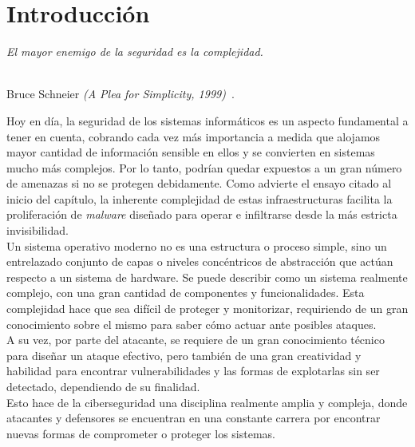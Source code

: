 \chapter{Introducción}
\label{cap:capitulo1}
\setcounter{page}{1}

\begin{flushright}
\begin{minipage}[]{10cm}
\emph{\guillemotleft El mayor enemigo de la seguridad es la complejidad.\guillemotright}\\
\end{minipage}\\

Bruce Schneier \textit{(A Plea for Simplicity, 1999)}~\cite{schneier}.
\end{flushright}

\vspace{1cm}

Hoy en día, la seguridad de los sistemas informáticos es un aspecto fundamental a tener en cuenta, cobrando cada vez más importancia a medida que alojamos mayor cantidad de información sensible en ellos y se convierten en sistemas mucho más complejos. Por lo tanto, podrían quedar expuestos a un gran número de amenazas si no se protegen debidamente.
Como advierte el ensayo citado al inicio del capítulo, la inherente complejidad de estas infraestructuras facilita la proliferación de \textit{malware} diseñado para operar e infiltrarse desde la más estricta invisibilidad.\\

Un sistema operativo moderno no es una estructura o proceso simple, sino un entrelazado conjunto de capas o niveles concéntricos de abstracción que actúan respecto a un sistema de hardware. Se puede describir como un sistema realmente complejo, con una gran cantidad de componentes y funcionalidades. Esta complejidad hace que sea difícil de proteger y monitorizar, requiriendo de un gran conocimiento sobre el mismo para saber cómo actuar ante posibles ataques.\\

A su vez, por parte del atacante, se requiere de un gran conocimiento técnico para diseñar un ataque efectivo, pero también de una gran creatividad y habilidad para encontrar vulnerabilidades y las formas de explotarlas sin ser detectado, dependiendo de su finalidad.\\

Esto hace de la ciberseguridad una disciplina realmente amplia y compleja, donde atacantes y defensores se encuentran en una constante carrera por encontrar nuevas formas de comprometer o proteger los sistemas.\\


